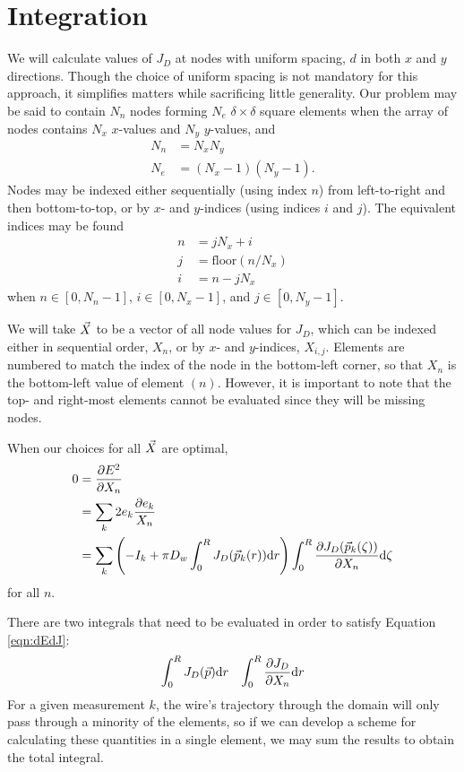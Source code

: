 \section{Integration}\label{sec:integral}

We will calculate values of $J_D$ at nodes with uniform spacing, $d$ in both $x$ and $y$ directions.  Though the choice of uniform spacing is not mandatory for this approach, it simplifies matters while sacrificing little generality.  Our problem may be said to contain $N_n$ nodes forming $N_e$ $\delta\times \delta$ square elements when the array of nodes contains $N_x$ $x$-values and $N_y$ $y$-values, and
\begin{align}
N_n &= N_x N_y\\
N_e &= (N_x -1)(N_y -1).
\end{align}
Nodes may be indexed either sequentially (using index $n$) from left-to-right and then bottom-to-top, or by $x$- and $y$-indices (using indices $i$ and $j$).  The equivalent indices may be found
\begin{align}
n &= jN_x + i\\
j &= \mathrm{floor}(n/N_x)\\
i &= n - jN_x
\end{align}
when $n \in [0, N_n-1]$, $i \in [0, N_x-1]$, and $j \in [0, N_y-1]$.  

We will take $\vec{X}$ to be a vector of all node values for $J_D$, which can be indexed either in sequential order, $X_n$, or by $x$- and $y$-indices, $X_{i,j}$.  Elements are numbered to match the index of the node in the bottom-left corner, so that $X_n$ is the bottom-left value of element $(n)$.  However, it is important to note that the top- and right-most elements cannot be evaluated since they will be missing nodes.

When our choices for all $\vec{X}$ are optimal,
\begin{align}
0 &= \frac{\partial E^2}{\partial X_n} \nonumber\\
& = \sum_k 2 e_k\frac{\partial e_k}{X_n} \nonumber\\
&= \sum_k \left(-I_k + \pi D_w \int_0^R J_D(\vec{p}_k(r)) \mathrm{d}r \right)\int_0^R \frac{\partial J_D(\vec{p}_k(\zeta))}{\partial X_n}\mathrm{d}\zeta\label{eqn:dEdJ}
\end{align}
for all $n$.

There are two integrals that need to be evaluated in order to satisfy Equation \ref{eqn:dEdJ}:
\begin{align}
\int_0^R J_D(\vec{p}) \mathrm{d}r & & \int_0^R \frac{\partial J_D}{\partial X_n} \mathrm{d}r\nonumber
\end{align}
For a given measurement $k$, the wire's trajectory through the domain will only pass through a minority of the elements, so if we can develop a scheme for calculating these quantities in a single element, we may sum the results to obtain the total integral.

